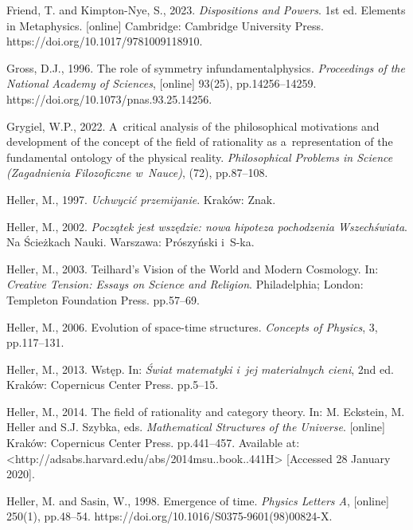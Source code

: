 Friend, T. and Kimpton-Nye, S., 2023. \textit{Dispositions and Powers}. 1st ed. Elements in Metaphysics. [online] Cambridge: Cambridge University Press. https://doi.org/10.1017/9781009118910.



Gross, D.J., 1996. The role of symmetry in\hspace{0.2em}fundamental\hspace{0.2em}physics. \textit{Proceedings of the National Academy of Sciences}, [online] 93(25), pp.14256–14259. https://doi.org/10.1073/pnas.93.25.14256.



Grygiel, W.P., 2022. A~critical analysis of the philosophical motivations and development of the concept of the field of rationality as a~representation of the fundamental ontology of the physical reality. \textit{Philosophical Problems in Science (Zagadnienia Filozoficzne w~Nauce)}, (72), pp.87–108.



Heller, M., 1997. \textit{Uchwycić przemijanie}. Kraków: Znak.



Heller, M., 2002. \textit{Początek jest wszędzie: nowa hipoteza pochodzenia Wszechświata}. Na Ścieżkach Nauki. Warszawa: Prószyński i~S-ka.



Heller, M., 2003. Teilhard's Vision of the World and Modern Cosmology. In: \textit{Creative Tension: Essays on Science and Religion}. Philadelphia; London: Templeton Foundation Press. pp.57–69.



Heller, M., 2006. Evolution of space-time structures. \textit{Concepts of Physics}, 3, pp.117–131.



Heller, M., 2013. Wstęp. In: \textit{Świat matematyki i~jej materialnych cieni}, 2nd ed. Kraków: Copernicus Center Press. pp.5–15.



Heller, M., 2014. The field of rationality and category theory. In: M. Eckstein, M. Heller and S.J. Szybka, eds. \textit{Mathematical Structures of the Universe}. [online] Kraków: Copernicus Center Press. pp.441–457. Available at: {\textless}http://adsabs.harvard.edu/abs/2014msu..book..441H{\textgreater} [Accessed 28 January 2020].



Heller, M. and Sasin, W., 1998. Emergence of time. \textit{Physics Letters A}, [online] 250(1), pp.48–54. https://doi.org/10.1016/S0375-9601(98)00824-X.



